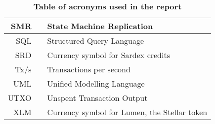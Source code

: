 \begin{table}
\begin{centering}
{\begin{tabular}{| r | c | l |}
\hline
SMR		&& State Machine Replication\\
\hline
SQL		&& Structured Query Language\\
\hline
SRD		&& Currency symbol for Sardex credits\\
\hline
Tx/s		&& Transactions per second\\
\hline
UML		&& Unified Modelling Language\\
\hline
UTXO	&& Unspent Transaction Output\\
\hline
XLM		&& Currency symbol for Lumen, the Stellar token\\
\hline
\end{tabular}}
\caption{\bf \small Table of acronyms used in the report}
\label{acronyms}
\end{centering}
\end{table}











\newpage











